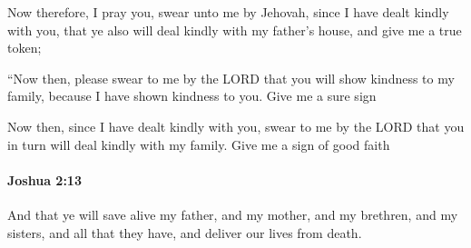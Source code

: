 			\begin{versebox}
					\item[BHS] 
					\item[ASV] Now therefore, I pray you, swear unto me by Jehovah, since I have dealt kindly with you, that ye also will deal kindly with my father's house, and give me a true token;
					\item[NIV] “Now then, please swear to me by the LORD that you will show kindness to my family, because I have shown kindness to you. Give me a sure sign
					\item[NRSV] Now then, since I have dealt kindly with you, swear to me by the LORD that you in turn will deal kindly with my family. Give me a sign of good faith
			\end{versebox}

		\paragraph{Joshua 2:13} %
			\label{JOSHUA-2-13}

			And that ye will save alive my father, and my mother, and my brethren, and my sisters, and all that they have, and deliver our lives from death.

